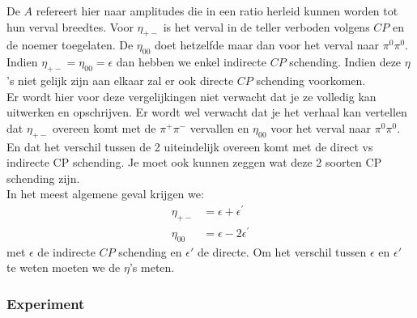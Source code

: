 \documentclass[../main.tex]{subfiles}
\begin{document}
De $A$ refereert hier naar amplitudes die in een ratio herleid kunnen worden tot hun verval breedtes. Voor $\eta_{+-}$ is het verval in  de teller verboden volgens $CP$ en de noemer toegelaten. De $\eta_{00}$ doet hetzelfde maar dan voor het verval naar $\pi^0\pi^0$. Indien $\eta_{+-}=\eta_{00}=\epsilon$ dan hebben we enkel indirecte $CP$ schending. Indien deze $\eta$'s niet gelijk zijn aan elkaar zal er ook directe $CP$ schending voorkomen.\\
{\color{red} Er wordt hier voor deze vergelijkingen niet verwacht dat je ze volledig kan uitwerken en opschrijven. Er wordt wel verwacht dat je het verhaal kan vertellen dat $\eta_{+-}$ overeen komt met de $\pi^+\pi^-$ vervallen en $\eta_{00}$ voor het verval naar $\pi^0\pi^0$. En dat het verschil tussen de 2 uiteindelijk overeen komt met de direct vs indirecte CP schending. Je moet ook kunnen zeggen wat deze 2 soorten CP schending zijn.}\\
In het meest algemene geval krijgen we:
\begin{equation}
    \begin{aligned}
        \label{eq:direct_indirect_algemeen}
        \eta_{+-} &=\epsilon+\epsilon^{\prime} \\
        \eta_{00} &=\epsilon-2 \epsilon^{\prime}
    \end{aligned}
\end{equation}
met $\epsilon$ de indirecte $CP$ schending en $\epsilon'$ de directe. Om het verschil tussen $\epsilon$ en $\epsilon'$ te weten moeten we de $\eta$'s meten.

\subsubsection{Experiment}%
\label{ssub:experiment}
\end{document}

